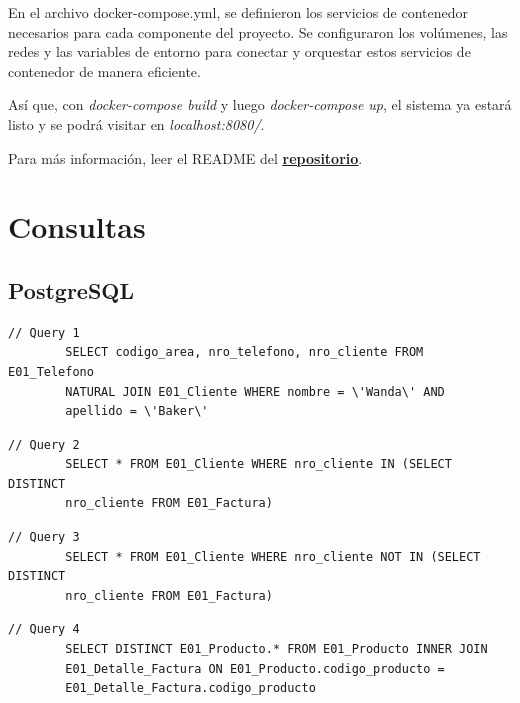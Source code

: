 \documentclass[a4paper,12pt]{article}
\begin{document}
	\bigskip
	
	En el archivo docker-compose.yml, se definieron los servicios de contenedor necesarios para cada componente del proyecto. Se configuraron los volúmenes, las redes y las variables de entorno para conectar y orquestar estos servicios de contenedor de manera eficiente.
	
	\bigskip
	
	Así que, con \textit{docker-compose build} y luego \textit{docker-compose up}, el sistema ya estará listo y se podrá visitar en \textit{localhost:8080/}. 
	
	\bigskip
		
	Para más información, leer el README del \href{https://github.com/TomyMarengo/bd2-tpo}{\underline{{\textbf{repositorio}}}}.
	
	\newpage
	
	\section{Consultas}
	
	\subsection{PostgreSQL}
	
	\begin{lstlisting}[frame=single, tabsize=1]
		// Query 1
		SELECT codigo_area, nro_telefono, nro_cliente FROM E01_Telefono 
		NATURAL JOIN E01_Cliente WHERE nombre = \'Wanda\' AND 
		apellido = \'Baker\'
	\end{lstlisting}

	\bigskip

	\begin{lstlisting}[frame=single, tabsize=1]
		// Query 2
		SELECT * FROM E01_Cliente WHERE nro_cliente IN (SELECT DISTINCT
		nro_cliente FROM E01_Factura)
	\end{lstlisting}

	\bigskip

	\begin{lstlisting}[frame=single, tabsize=1]
		// Query 3
		SELECT * FROM E01_Cliente WHERE nro_cliente NOT IN (SELECT DISTINCT
		nro_cliente FROM E01_Factura)
	\end{lstlisting}

	\bigskip

	\begin{lstlisting}[frame=single, tabsize=1]
		// Query 4
		SELECT DISTINCT E01_Producto.* FROM E01_Producto INNER JOIN
		E01_Detalle_Factura ON E01_Producto.codigo_producto =
		E01_Detalle_Factura.codigo_producto
	\end{lstlisting}
\end{document}
